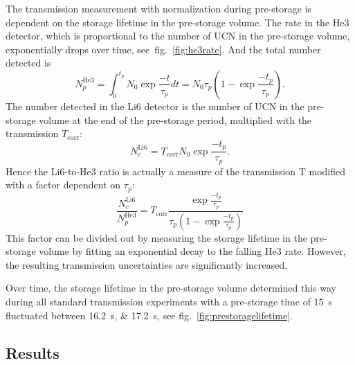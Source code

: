 \documentclass[10pt,letterpaper]{article}
\begin{document}
The transmission measurement with normalization during pre-storage is dependent on the storage lifetime in the pre-storage volume. The rate in the He3 detector, which is proportional to the number of UCN in the pre-storage volume, exponentially drops over time, see~fig.~\ref{fig:he3rate}. And the total number detected is
\begin{equation}
N_p^\mathrm{He3} = \int_0^{t_p} N_0 \exp \frac{-t}{\tau_p} dt = N_0 \tau_p \left( 1 - \exp \frac{-t_p}{\tau_p} \right).
\end{equation}
The number detected in the Li6 detector is the number of UCN in the pre-storage volume at the end of the pre-storage period, multiplied with the transmission $T_\mathrm{corr}$:
\begin{equation}
N_c^\mathrm{Li6} = T_\mathrm{corr} N_0 \exp \frac{-t_p}{\tau_p}.
\end{equation}
Hence the Li6-to-He3 ratio is actually a measure of the transmission T modified with a factor dependent on $\tau_p$:
\begin{equation}
\frac{N_c^\mathrm{Li6}}{N_p^\mathrm{He3}} = T_\mathrm{corr} \frac{\exp \frac{-t_p}{\tau_p}}{\tau_p \left( 1 - \exp \frac{-t_p}{\tau_p} \right)}
\end{equation}
This factor can be divided out by measuring the storage lifetime in the pre-storage volume by fitting an exponential decay to the falling He3 rate. However, the resulting transmission uncertainties are significantly increased.

Over time, the storage lifetime in the pre-storage volume determined this way during all standard transmission experiments with a pre-storage time of \SI{15}{\second} fluctuated between \SIlist{16.2;17.2}{\second}, see fig.~\ref{fig:prestoragelifetime}.


\subsection{Results}
\end{document}
